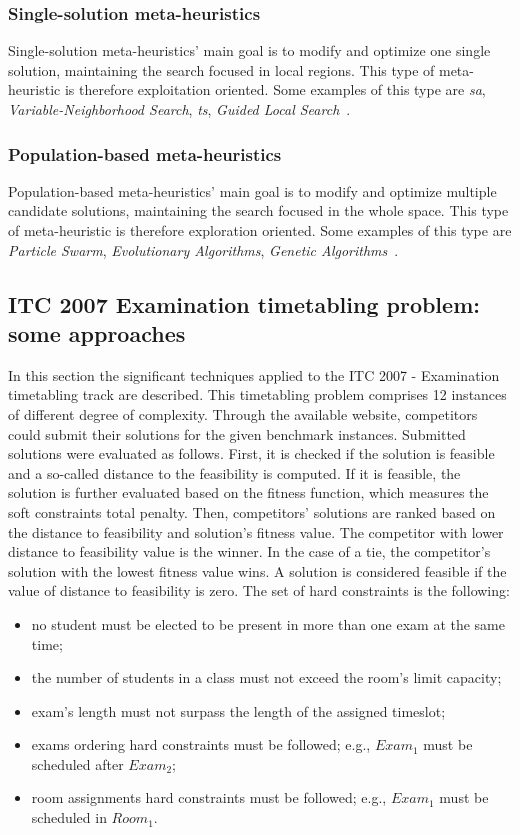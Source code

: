 \subsubsection{Single-solution meta-heuristics}
Single-solution meta-heuristics' main goal is to modify and optimize one single solution, maintaining the search focused in local regions. This type of meta-heuristic is therefore exploitation oriented. Some examples of this type are \textit{\gls{sa}}, \textit{Variable-Neighborhood Search}, \textit{\gls{ts}}, \textit{Guided Local Search}~\cite{Talbi2009}. \\

\subsubsection{Population-based meta-heuristics}
Population-based meta-heuristics' main goal is to modify and optimize multiple candidate solutions, maintaining the search focused in the whole space. This type of meta-heuristic is therefore exploration oriented. Some examples of this type are \textit{Particle Swarm}, \textit{Evolutionary Algorithms}, \textit{Genetic Algorithms}~\cite{Talbi2009}.\\


\subsection{ITC 2007 Examination timetabling problem: some approaches}
\label{subsection:ApprITC2007}

In this section the significant techniques applied to the ITC 2007 - Examination timetabling track are described. This timetabling problem comprises 12 instances of different degree of complexity. Through the available website, competitors could submit their solutions for the given benchmark instances. Submitted solutions were evaluated as follows. First, it is checked if the solution is feasible and a so-called distance to the feasibility is computed. If it is feasible, the solution is further evaluated based on the fitness function, which measures the soft constraints total penalty. Then, competitors' solutions are ranked based on the distance to feasibility and solution's fitness value. The competitor with lower distance to feasibility value is the winner. In the case of a tie, the competitor's solution with the lowest fitness value wins. A solution is considered feasible if the value of distance to feasibility is zero. The set of hard constraints is the following:
\begin{itemize}
	\item no student must be elected to be present in more than one exam at the same time;
	\item the number of students in a class must not exceed the room's limit capacity;
	\item exam's length must not surpass the length of the assigned timeslot;
	\item exams ordering hard constraints must be followed; e.g., $Exam_1$ must be scheduled after $Exam_2$;
	\item room assignments hard constraints must be followed; e.g., 	$Exam_1$ must be scheduled in $Room_1$.
\end{itemize}

